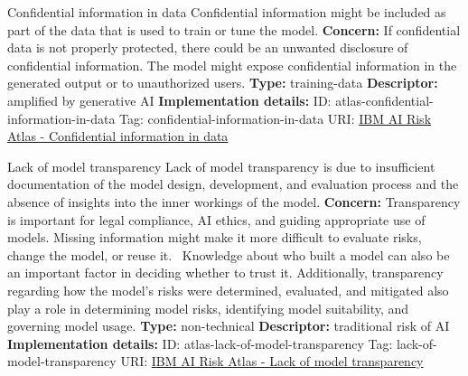 \begin{definitionbox}{Confidential information in data}
Confidential information might be included as part of the data that is used to train or tune the model.\newline\newline
\textbf{Concern: }If confidential data is not properly protected, there could be an unwanted disclosure of confidential information. The model might expose confidential information in the generated output or to unauthorized users.\newline\newline
\textbf{Type: }training-data\newline
\textbf{Descriptor: }amplified by generative AI \newline\newline
\textbf{Implementation details: } \newline
ID: atlas-confidential-information-in-data \newline
Tag: confidential-information-in-data \newline
URI:  \href{https://www.ibm.com/docs/en/watsonx/saas?topic=SSYOK8/wsj/ai-risk-atlas/confidential-information-in-data.html}{IBM AI Risk Atlas - Confidential information in data}\newline
\end{definitionbox}
\begin{definitionbox}{Lack of model transparency}
Lack of model transparency is due to insufficient documentation of the model design, development, and evaluation process and the absence of insights into the inner workings of the model.\newline\newline
\textbf{Concern: }Transparency is important for legal compliance, AI ethics, and guiding appropriate use of models. Missing information might make it more difficult to evaluate risks,  change the model, or reuse it.  Knowledge about who built a model can also be an important factor in deciding whether to trust it. Additionally, transparency regarding how the model's risks were determined, evaluated, and mitigated also play a role in determining model risks, identifying model suitability, and governing model usage.\newline\newline
\textbf{Type: }non-technical\newline
\textbf{Descriptor: }traditional risk of AI \newline\newline
\textbf{Implementation details: } \newline
ID: atlas-lack-of-model-transparency \newline
Tag: lack-of-model-transparency \newline
URI:  \href{https://www.ibm.com/docs/en/watsonx/saas?topic=SSYOK8/wsj/ai-risk-atlas/lack-of-model-transparency.html}{IBM AI Risk Atlas - Lack of model transparency}\newline
\end{definitionbox}
